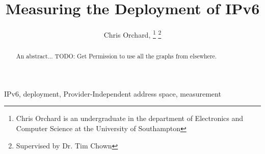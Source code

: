 \documentclass[10pt, final, conference, a4paper]{IEEEtran}
\begin{document}
\title{Measuring the Deployment of IPv6}

\author{Chris Orchard,
\thanks{Chris Orchard is an undergraduate in the department of Electronics and
Computer Science at the University of Southampton} 
\thanks{Supervised by Dr. Tim Chown}
}


\maketitle

\begin{abstract}
An abstract... TODO: Get Permission to use all the graphs from elsewhere.
\end{abstract}

\begin{IEEEkeywords}
IPv6, deployment, Provider-Independent address space, measurement
\end{IEEEkeywords}









{}
\end{document}
